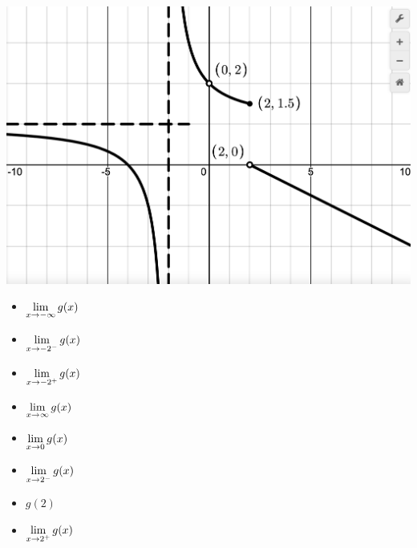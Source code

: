 \documentclass{ximera}
\begin{document}
\begin{enumerate}
\begin{center}
\includegraphics[width=5.5in]{./IntroLimitsGraphics/M2500_T01_Sp25_a.png}

\end{center}

\bigskip

\begin{multicols}{4}

\begin{itemize}

\item $\ds{\lim_{x \rightarrow -\infty} g(x)}$

\item $\ds{\lim_{x \rightarrow -2^{-}} g(x)}$

\item $\ds{\lim_{x \rightarrow -2^{+}} g(x)}$

\item  $\ds{\lim_{x \rightarrow \infty} g(x)}$

\end{itemize}

\end{multicols}

\bigskip

\begin{multicols}{4}

\begin{itemize}

\item $\ds{\lim_{x \rightarrow 0} g(x)}$

\item $\ds{\lim_{x \rightarrow 2^{-}} g(x)}$

\item  $g(2)$

\item $\ds{\lim_{x \rightarrow 2^{+}} g(x)}$
\end{itemize}

\end{multicols}

\bigskip

\setcounter{HW}{\value{enumi}}
\end{enumerate}
\end{document}
